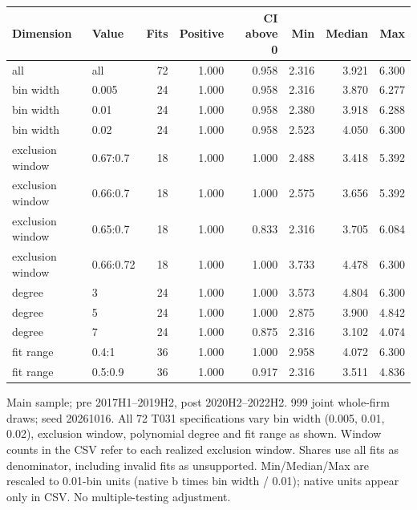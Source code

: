 \begingroup\scriptsize\setlength{\tabcolsep}{3pt}
\begin{threeparttable}
\begin{tabular}{llrrrrrr}
\toprule
Dimension & Value & Fits & Positive & CI above 0 & Min & Median & Max \\
\midrule
all & all & 72 & 1.000 & 0.958 & 2.316 & 3.921 & 6.300 \\
bin width & 0.005 & 24 & 1.000 & 0.958 & 2.316 & 3.870 & 6.277 \\
bin width & 0.01 & 24 & 1.000 & 0.958 & 2.380 & 3.918 & 6.288 \\
bin width & 0.02 & 24 & 1.000 & 0.958 & 2.523 & 4.050 & 6.300 \\
exclusion window & 0.67:0.7 & 18 & 1.000 & 1.000 & 2.488 & 3.418 & 5.392 \\
exclusion window & 0.66:0.7 & 18 & 1.000 & 1.000 & 2.575 & 3.656 & 5.392 \\
exclusion window & 0.65:0.7 & 18 & 1.000 & 0.833 & 2.316 & 3.705 & 6.084 \\
exclusion window & 0.66:0.72 & 18 & 1.000 & 1.000 & 3.733 & 4.478 & 6.300 \\
degree & 3 & 24 & 1.000 & 1.000 & 3.573 & 4.804 & 6.300 \\
degree & 5 & 24 & 1.000 & 1.000 & 2.875 & 3.900 & 4.842 \\
degree & 7 & 24 & 1.000 & 0.875 & 2.316 & 3.102 & 4.074 \\
fit range & 0.4:1 & 36 & 1.000 & 1.000 & 2.958 & 4.072 & 6.300 \\
fit range & 0.5:0.9 & 36 & 1.000 & 0.917 & 2.316 & 3.511 & 4.836 \\
\bottomrule
\end{tabular}
\begin{tablenotes}[flushleft]\footnotesize
\item[] Main sample; pre 2017H1--2019H2, post 2020H2--2022H2. 999 joint whole-firm draws; seed 20261016. All 72 T031 specifications vary bin width (0.005, 0.01, 0.02), exclusion window, polynomial degree and fit range as shown. Window counts in the CSV refer to each realized exclusion window. Shares use all fits as denominator, including invalid fits as unsupported. Min/Median/Max are rescaled to 0.01-bin units (native b times bin width / 0.01); native units appear only in CSV. No multiple-testing adjustment.
\end{tablenotes}
\end{threeparttable}
\endgroup
\par\medskip
